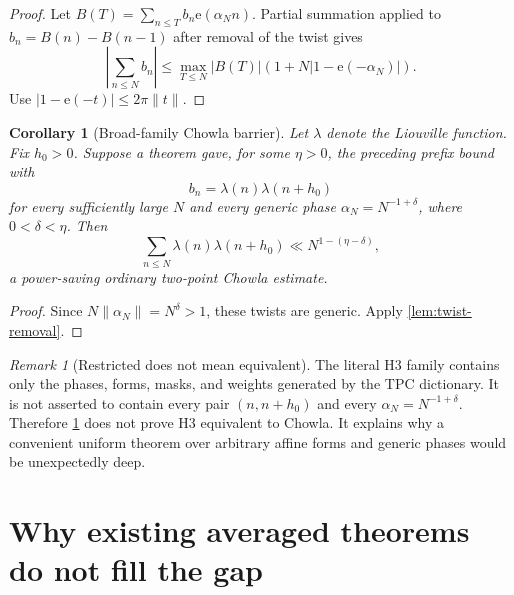 \documentclass[11pt]{article}
\newtheorem{corollary}[theorem]{Corollary}
\theoremstyle{definition}
\theoremstyle{remark}
\newtheorem{remark}[theorem]{Remark}
\newcommand{\e}{\mathrm e}
\begin{document}
\begin{proof}
Let
\(B(T)=\sum_{n\le T}b_n\e(\alpha_Nn)\).
Partial summation applied to
\(b_n=B(n)-B(n-1)\) after removal of the twist gives
\[
 \left|\sum_{n\le N}b_n\right|
 \le
 \max_{T\le N}|B(T)|
 \left(1+N|1-\e(-\alpha_N)|\right).
\]
Use \(|1-\e(-t)|\le2\pi\|t\|\).
\end{proof}

\begin{corollary}[Broad-family Chowla barrier]
\label{cor:chowla-barrier}
Let \(\lambda\) denote the Liouville function.  Fix \(h_0>0\).
Suppose a theorem gave, for some
\(\eta>0\), the preceding prefix bound with
\[
 b_n=\lambda(n)\lambda(n+h_0)
\]
for every sufficiently large \(N\) and every generic phase
\(\alpha_N=N^{-1+\delta}\), where \(0<\delta<\eta\).
Then
\[
 \sum_{n\le N}\lambda(n)\lambda(n+h_0)
 \ll N^{1-(\eta-\delta)},
\]
a power-saving ordinary two-point Chowla estimate.
\end{corollary}

\begin{proof}
Since \(N\|\alpha_N\|=N^\delta>1\), these twists are generic.  Apply
\cref{lem:twist-removal}.
\end{proof}

\begin{remark}[Restricted does not mean equivalent]
The literal H3 family contains only the phases, forms, masks, and
weights generated by the TPC dictionary.  It is not asserted to
contain every pair \((n,n+h_0)\) and every
\(\alpha_N=N^{-1+\delta}\).  Therefore
\cref{cor:chowla-barrier} does not prove H3 equivalent to Chowla.
It explains why a convenient uniform theorem over arbitrary affine
forms and generic phases would be unexpectedly deep.
\end{remark}

\section{\texorpdfstring{\hspace{0.35em}}{}Why existing averaged theorems do not fill the gap}
\end{document}
